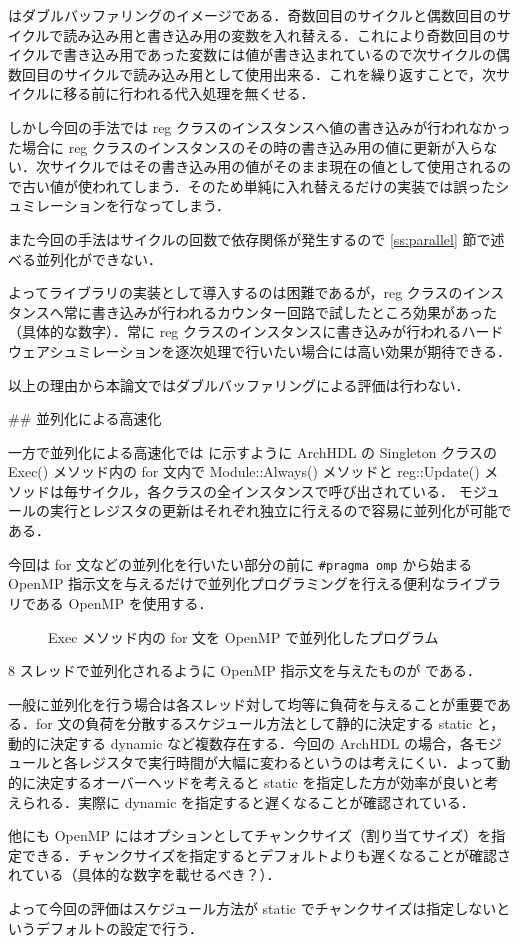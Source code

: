  はダブルバッファリングのイメージである．奇数回目のサイクルと偶数回目のサイクルで読み込み用と書き込み用の変数を入れ替える．これにより奇数回目のサイクルで書き込み用であった変数には値が書き込まれているので次サイクルの偶数回目のサイクルで読み込み用として使用出来る．これを繰り返すことで，次サイクルに移る前に行われる代入処理を無くせる．

しかし今回の手法では reg クラスのインスタンスへ値の書き込みが行われなかった場合に
reg クラスのインスタンスのその時の書き込み用の値に更新が入らない．次サイクルではその書き込み用の値がそのまま現在の値として使用されるので古い値が使われてしまう．そのため単純に入れ替えるだけの実装では誤ったシュミレーションを行なってしまう．

また今回の手法はサイクルの回数で依存関係が発生するので \ref{ss:parallel} 節で述べる並列化ができない．

よってライブラリの実装として導入するのは困難であるが，reg クラスのインスタンスへ常に書き込みが行われるカウンター回路で試したところ効果があった（具体的な数字）．常に reg クラスのインスタンスに書き込みが行われるハードウェアシュミレーションを逐次処理で行いたい場合には高い効果が期待できる．

以上の理由から本論文ではダブルバッファリングによる評価は行わない．



## 並列化による高速化 \label{ss:parallel}

一方で並列化による高速化では  に示すように
ArchHDL の Singleton クラスの Exec() メソッド内の
for 文内で Module::Always() メソッドと
reg::Update() メソッドは毎サイクル，各クラスの全インスタンスで呼び出されている．
モジュールの実行とレジスタの更新はそれぞれ独立に行えるので容易に並列化が可能である．

今回は for 文などの並列化を行いたい部分の前に \verb/#pragma omp/ から始まる OpenMP 指示文を与えるだけで並列化プログラミングを行える便利なライブラリである OpenMP \cite{openmp}を使用する．

\begin{figure}[t]
 
 \caption{Exec メソッド内の for 文を OpenMP で並列化したプログラム}
 \label{src:exec_openmp}
\end{figure}

8 スレッドで並列化されるように OpenMP 指示文を与えたものが  である．

一般に並列化を行う場合は各スレッド対して均等に負荷を与えることが重要である．for 文の負荷を分散するスケジュール方法として静的に決定する static と，動的に決定する dynamic など複数存在する．今回の ArchHDL の場合，各モジュールと各レジスタで実行時間が大幅に変わるというのは考えにくい．よって動的に決定するオーバーヘッドを考えると static を指定した方が効率が良いと考えられる．実際に dynamic を指定すると遅くなることが確認されている．

他にも OpenMP にはオプションとしてチャンクサイズ（割り当てサイズ）を指定できる．チャンクサイズを指定するとデフォルトよりも遅くなることが確認されている（具体的な数字を載せるべき？）．

よって今回の評価はスケジュール方法が static でチャンクサイズは指定しないというデフォルトの設定で行う．

